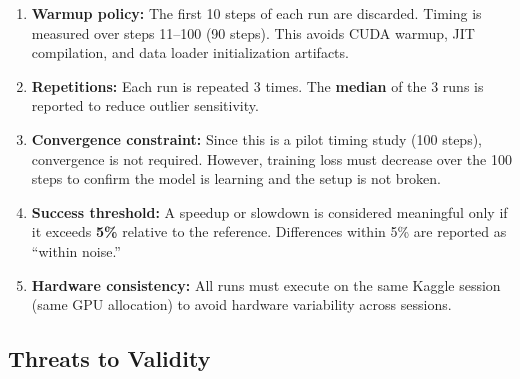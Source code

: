 \documentclass[12pt, a4paper]{article}
\begin{document}
\begin{enumerate}
    \item \textbf{Warmup policy:} The first 10 steps of each run are discarded. Timing is measured over steps 11--100 (90 steps). This avoids CUDA warmup, JIT compilation, and data loader initialization artifacts.
    \item \textbf{Repetitions:} Each run is repeated 3 times. The \textbf{median} of the 3 runs is reported to reduce outlier sensitivity.
    \item \textbf{Convergence constraint:} Since this is a pilot timing study (100 steps), convergence is not required. However, training loss must decrease over the 100 steps to confirm the model is learning and the setup is not broken.
    \item \textbf{Success threshold:} A speedup or slowdown is considered meaningful only if it exceeds \textbf{5\%} relative to the reference. Differences within 5\% are reported as ``within noise.''
    \item \textbf{Hardware consistency:} All runs must execute on the same Kaggle session (same GPU allocation) to avoid hardware variability across sessions.
\end{enumerate}

\subsection{Threats to Validity}
\end{document}
